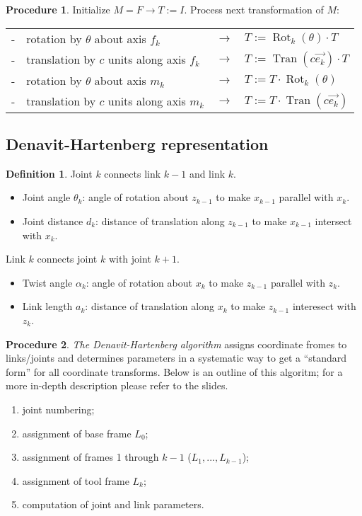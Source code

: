 \documentclass{article}
\theoremstyle{definition}
\newtheorem{definition}{Definition}[section]
\newtheorem{procedure}{Procedure}[section]
\DeclareMathOperator{\Tran}{Tran}
\DeclareMathOperator{\Rot}{Rot}
\begin{document}
\begin{procedure}
Initialize $M = F \rightarrow T := I$.\newline
Process next transformation of $M$:\newline
\begin{tabular}{rlcl}
- & rotation by $\theta$ about axis $f_k$ & $\rightarrow$ & $T := \Rot_k(\theta) \cdot T$ \\
- & translation by $c$ units along axis $f_k$ & $\rightarrow$ & $T := \Tran(c \vec{e_k}) \cdot T$ \\
- & rotation by $\theta$ about axis $m_k$ & $\rightarrow$ & $T := T \cdot \Rot_k(\theta)$ \\
- & translation by $c$ units along axis $m_k$ & $\rightarrow$ & $T := T \cdot \Tran(c \vec{e_k})$ \\
\end{tabular}
\end{procedure}

\subsection{Denavit-Hartenberg representation}
\begin{definition}
Joint $k$ connects link $k-1$ and link $k$.
\begin{itemize}
\item Joint angle $\theta_k$: angle of rotation about $z_{k-1}$ to make $x_{k-1}$ parallel with $x_k$.
\item Joint distance $d_k$: distance of translation along $z_{k-1}$ to make $x_{k-1}$ intersect with $x_k$.
\end{itemize}
Link $k$ connects joint $k$ with joint $k+1$.
\begin{itemize}
\item Twist angle $\alpha_k$: angle of rotation about $x_k$ to make $z_{k-1}$ parallel with $z_k$.
\item Link length $a_k$: distance of translation along $x_k$ to make $z_{k-1}$ interesect with $z_k$.
\end{itemize}
\end{definition}

\begin{procedure}
\emph{The Denavit-Hartenberg algorithm} assigns coordinate fromes to links/joints and determines parameters in a systematic way to get a ``standard form'' for all coordinate transforms. Below is an outline of this algoritm; for a more in-depth description please refer to the slides.
\begin{enumerate}
\item joint numbering;
\item assignment of base frame $L_0$;
\item assignment of frames 1 through $k-1$ ($L_1, ..., L_{k-1}$);
\item assignment of tool frame $L_k$;
\item computation of joint and link parameters.
\end{enumerate}
\end{procedure}
\end{document}
